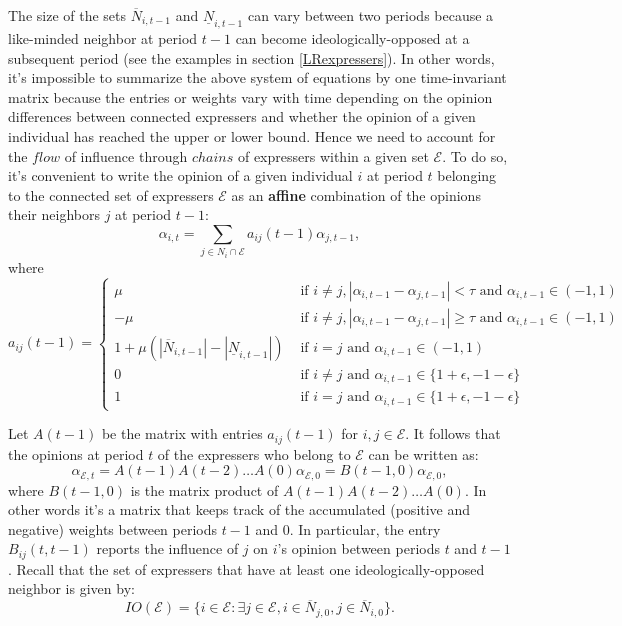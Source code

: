 \documentclass{article}
\begin{document}
\noindent The size of the sets $\overline{N}_{i,t-1}$ and $\underline{N}_{i,t-1}$ can vary between two periods because a like-minded neighbor at period $t-1$ can become ideologically-opposed at a subsequent period (see the examples in section \ref{LRexpressers}). In other words, it's impossible to summarize the above system of equations by one time-invariant matrix because the entries or weights vary with time depending on the opinion differences between connected expressers and whether the opinion of a given individual has reached the upper or lower bound. Hence we need to account for the $flow$ of influence through $chains$ of expressers within a given set $\mathcal{E}$. To do so, it's convenient to write the opinion of a given individual $i$ at period $t$ belonging to the connected set of expressers $\mathcal{E}$ as an \textbf{affine} combination of the opinions their neighbors $j$ at period $t-1$:
\begin{equation}
\alpha_{i,t} = \sum_{j \in N_i \cap \mathcal{E}} a_{ij} (t-1) \alpha_{j,t-1}, \label{accumulatedweights}
\end{equation}
where
\begin{equation*}
a_{ij} (t-1) = 
\begin{cases}
\mu & \text{ if } i \neq j , | \alpha_{i,t-1} - \alpha_{j,t-1} |< \tau  \text{ and } \alpha_{i,t-1} \in (-1,1) \\
- \mu & \text{ if } i \neq j , | \alpha_{i,t-1} - \alpha_{j,t-1} | \geq \tau  \text{ and }  \alpha_{i,t-1} \in (-1,1) \\
1 + \mu (|\overline{N}_{i,t-1}| - |\underline{N}_{i,t-1}|) & \text{ if } i=j \text{ and }  \alpha_{i,t-1} \in (-1,1)  \\
0 &  \text{ if } i \neq j \text{ and }  \alpha_{i,t-1} \in \{ 1 + \epsilon , -1 - \epsilon \}  \\
1 &  \text{ if } i = j \text{ and }  \alpha_{i,t-1} \in \{ 1 + \epsilon , -1 - \epsilon\}
\end{cases}
\end{equation*}

\noindent Let $A(t-1)$ be the matrix with entries $a_{ij}(t-1)$ for $i, j \in \mathcal{E}$. It follows that the opinions at period $t$ of the expressers who belong to $\mathcal{E}$ can be written as: 
$$ \alpha_{\mathcal{E},t} = A(t-1) A(t-2) \ldots A (0) \alpha_{\mathcal{E},0} = B(t-1,0) \alpha_{\mathcal{E},0} , $$
\noindent where $B(t-1,0)$ is the matrix product of $A(t-1) A(t-2) \ldots A (0)$. In other words it's a matrix that keeps track of the accumulated (positive and negative) weights between periods $t-1$ and $0$. In particular, the entry $B_{ij} (t,t-1)$ reports the influence of $j$ on $i$'s opinion between periods $t$ and $t-1$. Recall that the set of expressers that have at least one ideologically-opposed neighbor is given by: $$IO(\mathcal{E}) =\{  i \in \mathcal{E} :   \exists j \in \mathcal{E}, i \in \overline{N}_{j,0}  , j \in \overline{N}_{i,0}   \}. $$
\end{document}

